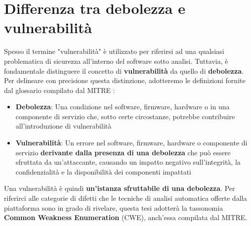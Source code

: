 \documentclass[../main.tex]{subfiles}
\begin{document}
\section{Differenza tra debolezza e vulnerabilità}
Spesso il termine "vulnerabilità" è utilizzato per riferirsi ad una qualsiasi problematica di sicurezza all'interno del software sotto analisi.
Tuttavia, è fondamentale distinguere il concetto di \textbf{vulnerabilità} da quello di \textbf{debolezza}.
Per delineare con precisione questa distinzione, adotteremo le definizioni fornite dal glossario compilato dal MITRE \cite{mitre_glossary}:
\begin{itemize}
    \item \textbf{Debolezza}: Una condizione nel software, firmware, hardware o in una componente di servizio che, sotto certe circostanze, potrebbe contribuire all'introduzione di vulnerabilità
    \item \textbf{Vulnerabilità}: Un errore nel software, firmware, hardware o componente di servizio \textbf{derivante dalla presenza di una debolezza} che può essere sfruttata da un'attaccante, causando un impatto negativo sull'integrità, la confidenzialità e la disponibilità dei componenti impattati
\end{itemize}
Una vulnerabilità è quindi \textbf{un'istanza sfruttabile di una debolezza}.
Per riferirci alle categorie di difetti che le tecniche di analisi automatica offerte dalla piattaforma sono in grado di rivelare, questa tesi adotterà la tassonomia \textbf{Common Weakness Enumeration} (CWE), anch'essa compilata dal MITRE.
\end{document}
